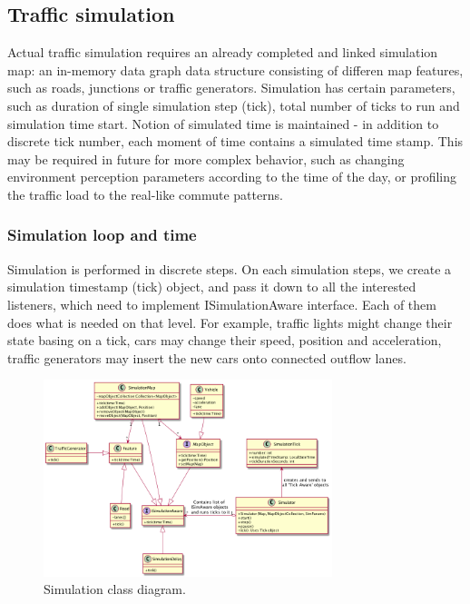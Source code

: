 \subsection{Traffic simulation}
Actual traffic simulation requires an already completed and linked simulation map: an in-memory data graph data structure consisting of differen map features, such as roads, junctions or traffic generators. Simulation has certain parameters, such as duration of single simulation step (tick), total number of ticks to run and simulation time start. Notion of simulated time is maintained - in addition to discrete tick number, each moment of time contains a simulated time stamp. This may be required in future for more complex behavior, such as changing environment perception parameters according to the time of the day, or profiling the traffic load to the real-like commute patterns.

\subsubsection{Simulation loop and time}
Simulation is performed in discrete steps. On each simulation steps, we create a simulation timestamp (tick) object, and pass it down to all the interested listeners, which need to implement ISimulationAware interface. Each of them does what is needed on that level. For example, traffic lights might change their state basing on a tick, cars may change their speed, position and acceleration, traffic generators may insert the new cars onto connected outflow lanes.

\begin{figure}[h]
    \vspace{1.5em}
    \caption{Simulation class diagram.}
    \label{fig:simulationClassDiagram}
    \centering
    \includegraphics[width=0.75\textwidth]{../../uml_diagrams/simulatorClassDiagram.png}
\end{figure}

